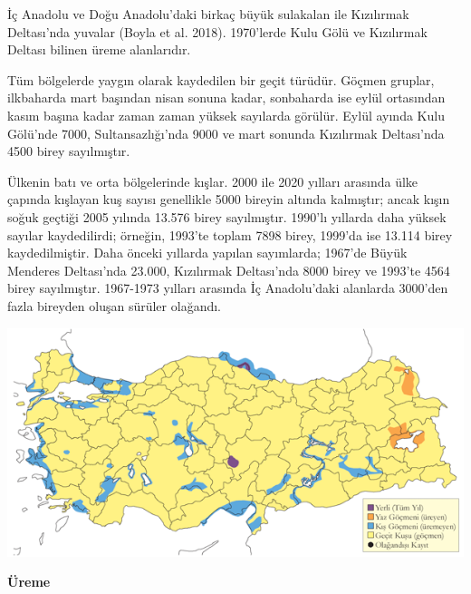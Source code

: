\documentclass[
  letterpaper,
  DIV=11,
  numbers=noendperiod]{scrreprt}
\begin{document}
İç Anadolu ve Doğu Anadolu'daki birkaç büyük sulakalan ile Kızılırmak
Deltası'nda yuvalar (Boyla et al. 2018). 1970'lerde Kulu Gölü ve
Kızılırmak Deltası bilinen üreme alanlarıdır.

Tüm bölgelerde yaygın olarak kaydedilen bir geçit türüdür. Göçmen
gruplar, ilkbaharda mart başından nisan sonuna kadar, sonbaharda ise
eylül ortasından kasım başına kadar zaman zaman yüksek sayılarda
görülür. Eylül ayında Kulu Gölü'nde 7000, Sultansazlığı'nda 9000 ve mart
sonunda Kızılırmak Deltası'nda 4500 birey sayılmıştır.

Ülkenin batı ve orta bölgelerinde kışlar. 2000 ile 2020 yılları arasında
ülke çapında kışlayan kuş sayısı genellikle 5000 bireyin altında
kalmıştır; ancak kışın soğuk geçtiği 2005 yılında 13.576 birey
sayılmıştır. 1990'lı yıllarda daha yüksek sayılar kaydedilirdi; örneğin,
1993'te toplam 7898 birey, 1999'da ise 13.114 birey kaydedilmiştir. Daha
önceki yıllarda yapılan sayımlarda; 1967'de Büyük Menderes Deltası'nda
23.000, Kızılırmak Deltası'nda 8000 birey ve 1993'te 4564 birey
sayılmıştır. 1967-1973 yılları arasında İç Anadolu'daki alanlarda
3000'den fazla bireyden oluşan sürüler olağandı.

\includegraphics{images/harita_Page_017.png}

\textbf{Üreme}
\end{document}
